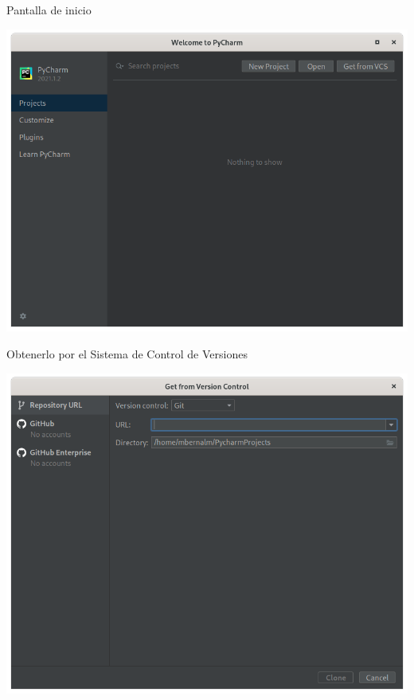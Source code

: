 \begin{frame}[c]{Pantalla de inicio}
    \begin{center}
        \includegraphics[scale=0.3]{img/pantalla-de-inicio.png}
    \end{center}
\end{frame}

\begin{frame}[c]{Obtenerlo por el Sistema de Control de Versiones}
    \begin{center}
        \includegraphics[scale=0.3]{img/get-from-vcs.png}
    \end{center}
\end{frame}

